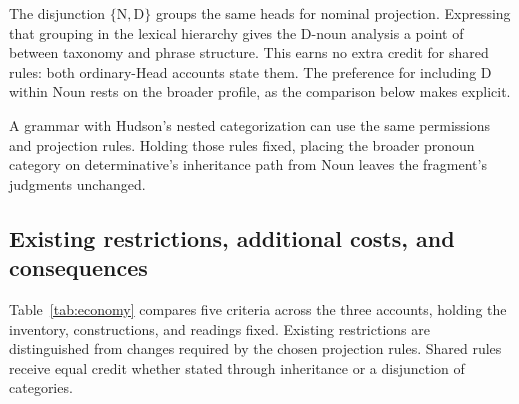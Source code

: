 \documentclass[12pt]{article}
\begin{document}
The disjunction $\{\mathrm{N},\mathrm{D}\}$ groups the same heads for nominal projection. Expressing that grouping in the lexical hierarchy gives the D-noun analysis a point of  between taxonomy and phrase structure. This earns no extra credit for shared rules: both ordinary-Head accounts state them. The preference for including D within Noun rests on the broader profile, as the comparison below makes explicit.

A grammar with Hudson's nested categorization can use the same permissions and projection rules. Holding those rules fixed, placing the broader pronoun category on determinative's inheritance path from Noun leaves the fragment's judgments unchanged.

\subsection{Existing restrictions, additional costs, and consequences}\label{sec:costs}

Table~\ref{tab:economy} compares five criteria across the three accounts, holding the inventory, constructions, and readings fixed. Existing restrictions are distinguished from changes required by the chosen projection rules. Shared rules receive equal credit whether stated through inheritance or a disjunction of categories.
\end{document}
